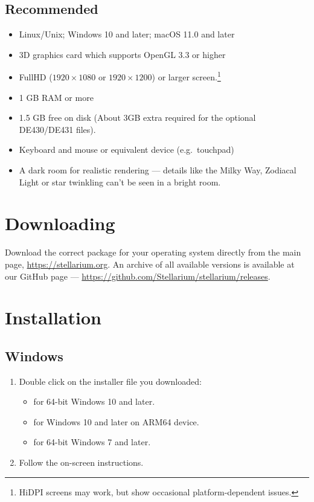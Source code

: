\subsection{Recommended}
\begin{itemize}
\item Linux/Unix; Windows 10 and later; macOS 11.0 and later
\item 3D graphics card which supports OpenGL 3.3 or higher
\item FullHD ($1920\times1080$ or $1920\times1200$) or larger screen.\footnote{HiDPI screens may work, but show occasional platform-dependent issues.}
\item 1 GB RAM or more
\item 1.5 GB free on disk (About 3GB extra required for the optional DE430/DE431 files).
\item Keyboard and mouse or equivalent device (e.g.\ touchpad)
\item A dark room for realistic rendering --- details like the Milky Way, Zodiacal Light 
      or star twinkling can't be seen in a bright room.
\end{itemize}


\section{Downloading}
\label{sec:GettingStarted:Downloading}

Download the correct package for your operating system directly from the main page, \newline \url{https://stellarium.org}.
An archive of all available versions is available at our GitHub page --- \url{https://github.com/Stellarium/stellarium/releases}.

\section{Installation}
\label{sec:GettingStarted:Installation}

\subsection{Windows}
\label{sec:GettingStarted:Installation:Windows}

\begin{enumerate}
\item Double click on the installer file you downloaded:
\begin{itemize}
\item {} for 64-bit Windows 10 and later.
\item {} for Windows 10 and later on ARM64 device.
\item {} for 64-bit Windows 7 and later.
\end{itemize}
\item Follow the on-screen instructions.
\end{enumerate}

